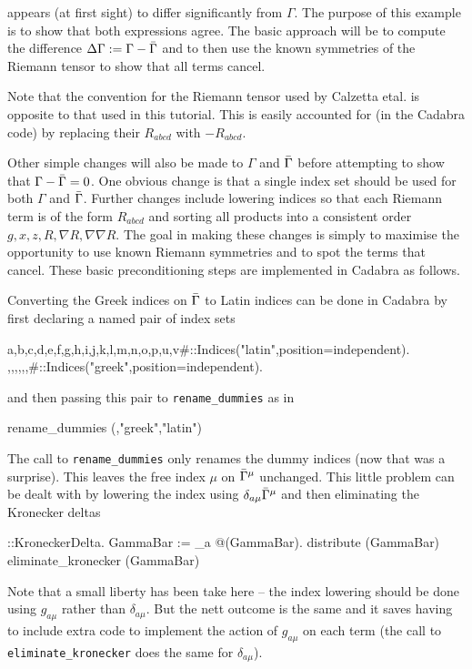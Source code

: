 \documentclass[a4paper,12pt]{article}
\numberwithin{equation}{section}%
\begin{document}
appears (at first sight) to differ significantly from $\Gamma$. The purpose of this example
is to show that both expressions agree. The basic approach will be to compute the difference
$\Delta\Gamma:=\Gamma - {\bar{\Gamma}}$ and to then use the known symmetries of the Riemann
tensor to show that all terms cancel.

Note that the convention for the Riemann tensor used by Calzetta etal. is opposite to that
used in this tutorial. This is easily accounted for (in the Cadabra code) by replacing their
$R_{abcd}$ with $-R_{abcd}$.

Other simple changes will also be made to $\Gamma$ and ${\bar{\Gamma}}$ before attempting to show
that $\Gamma -{\bar{\Gamma}} = 0$. One obvious change is that a single index set should be used
for both $\Gamma$ and ${\bar{\Gamma}}$. Further changes include lowering indices so that each
Riemann term is of the form $R_{abcd}$ and sorting all products into a consistent order
$g,x,z,R,\nabla R,\nabla\nabla R$. The goal in making these changes is simply to maximise
the opportunity to use known Riemann symmetries and to spot the terms that cancel. These
basic preconditioning steps are implemented in Cadabra as follows.

Converting the Greek indices on ${\bar{\Gamma}}$ to Latin indices can be done in Cadabra by
first declaring a named pair of index sets
\begin{cadabra}[numbers=none]
   {a,b,c,d,e,f,g,h,i,j,k,l,m,n,o,p,u,v#}::Indices("latin",position=independent).
   {\mu,\nu,\rho,\sigma,\tau,\lambda,\xi#}::Indices("greek",position=independent).
\end{cadabra}
and then passing this pair to \verb|rename_dummies| as in
\begin{cadabra}[numbers=none]
   rename_dummies (\GammaBar,"greek","latin")
\end{cadabra}

The call to \verb|rename_dummies| only renames the dummy indices (now that was a surprise).
This leaves the free index $\mu$ on ${\bar{\Gamma}}^{\mu}$ unchanged. This little problem can be
dealt with by lowering the index using $\delta_{a\mu} {\bar{\Gamma}}^{\mu}$ and then eliminating
the Kronecker deltas
\begin{cadabra}[numbers=none]
   \delta{#}::KroneckerDelta.
   GammaBar := \delta_{a \mu} @(GammaBar).
   distribute (GammaBar)
   eliminate_kronecker (GammaBar)
\end{cadabra}
Note that a small liberty has been take here -- the index lowering should be done using
$g_{a \mu}$ rather than $\delta_{a\mu}$. But the nett outcome is the same and it saves
having to include extra code to implement the action of $g_{a\mu}$ on each term (the call to
\verb|eliminate_kronecker| does the same for $\delta_{a\mu}$).
\end{document}
